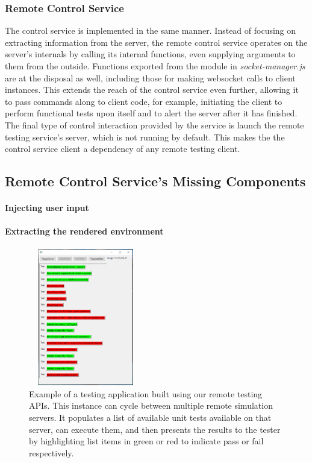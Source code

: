 \documentclass[conference]{IEEEtran}
\begin{document}
\subsubsection{Remote Control Service}
The control service is implemented in the same manner. Instead of focusing on extracting information from the server, the remote control service operates on the server's internals by calling its internal functions, even supplying arguments to them from the outside. Functions exported from the module in \textit{socket-manager.js} are at the disposal as well, including those for making websocket calls to client instances. This extends the reach of the control service even further, allowing it to pass commands along to client code, for example, initiating the client to perform functional tests upon itself and to alert the server after it has finished. The final type of control interaction provided by the service is launch the remote testing service's server, which is not running by default. This makes the the control service client a dependency of any remote testing client.

\subsection{Remote Control Service's Missing Components}
\paragraph{Injecting user input}
\paragraph{Extracting the rendered environment}

\begin{figure}[htbp]
\centerline{\includegraphics [width = 5cm, height = 6cm] {images/remoteTesting.PNG}}
\caption{Example of a testing application built using our remote testing APIs. This instance can cycle between multiple remote simulation servers. It populates a list of available unit tests available on that server, can execute them, and then presents the results to the tester by highlighting list items in green or red to indicate pass or fail respectively.}
\end{figure}
\end{document}
